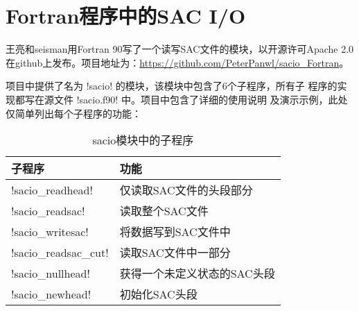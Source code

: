 \section{Fortran程序中的SAC I/O}
王亮和seisman用Fortran 90写了一个读写SAC文件的模块，以开源许可Apache 2.0
在github上发布。项目地址为：\url{https://github.com/PeterPanwl/sacio_Fortran}。

项目中提供了名为 !sacio! 的模块，该模块中包含了6个子程序，所有子
程序的实现都写在源文件 !sacio.f90! 中。项目中包含了详细的使用说明
及演示示例，此处仅简单列出每个子程序的功能：

\begin{table}[H]
\centering
\caption{sacio模块中的子程序}
\label{table:sacio_Fortran}
\begin{tabular}{ll}
\toprule
子程序      &   功能        \\
\midrule
!sacio_readhead!      &   仅读取SAC文件的头段部分 \\
!sacio_readsac!       &   读取整个SAC文件 \\
!sacio_writesac!      &   将数据写到SAC文件中 \\
!sacio_readsac_cut!   &   读取SAC文件中一部分 \\
!sacio_nullhead!      &   获得一个未定义状态的SAC头段\\
!sacio_newhead!       &   初始化SAC头段\\
\bottomrule
\end{tabular}
\end{table}
